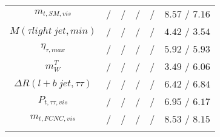 \begin{tabular}{cccccc}
$m_{t,SM,vis}$ &  / &  / &  / &  / & $8.57$ / $7.16$\\
$M(\tau  light~jet,min)$ &  / &  / &  / &  / & $4.42$ / $3.54$\\
$\eta_{\tau ,max}$ &  / &  / &  / &  / & $5.92$ / $5.93$\\
$m^{T}_{W}$ &  / &  / &  / &  / & $3.49$ / $6.06$\\
$\Delta R(l+b~jet,\tau \tau )$ &  / &  / &  / &  / & $6.42$ / $6.84$\\
$P_{t,\tau \tau ,vis}$ &  / &  / &  / &  / & $6.95$ / $6.17$\\
$m_{t,FCNC,vis}$ &  / &  / &  / &  / & $8.53$ / $8.15$\\
\bottomrule\bottomrule\\
\end{tabular}
